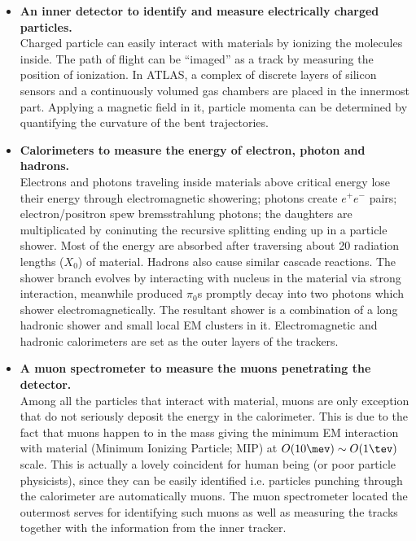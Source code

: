 \begin{itemize}
\item \textbf{An inner detector to identify and measure electrically charged particles.} \\
Charged particle can easily interact with materials by ionizing the molecules inside. 
The path of flight can be ``imaged'' as a track by measuring the position of ionization. 
In ATLAS, a complex of discrete layers of silicon sensors and a continuously volumed gas chambers are placed in the innermost part. 
Applying a magnetic field in it, particle momenta can be determined by quantifying the curvature of the bent trajectories. 

\item \textbf{Calorimeters to measure the energy of electron, photon and hadrons.} \\
Electrons and photons traveling inside materials above critical energy lose their energy through electromagnetic showering; photons create $e^+e^-$ pairs; electron/positron spew bremsstrahlung photons; the daughters are multiplicated by coninuting the recursive splitting ending up in a particle shower. 
Most of the energy are absorbed after traversing about 20 radiation lengths ($X_0$) of material. 
%
Hadrons also cause similar cascade reactions. 
The shower branch evolves by interacting with nucleus in the material via strong interaction, meanwhile produced $\pi_0$s promptly decay into two photons which shower electromagnetically. 
The resultant shower is a combination of a long hadronic shower and small local EM clusters in it. 
Electromagnetic and hadronic calorimeters are set as the outer layers of the trackers.\\

\item \textbf{A muon spectrometer to measure the muons penetrating the detector.} \\
Among all the particles that interact with material, muons are only exception that do not seriously deposit the energy in the calorimeter. 
This is due to the fact that muons happen to in the mass giving the minimum EM interaction with material (Minimum Ionizing Particle; MIP) at $O(10\mev) \sim O(1\tev)$ scale.
This is actually a lovely coincident for human being (or poor particle physicists), 
since they can be easily identified i.e. particles punching through the calorimeter are automatically muons. 
The muon spectrometer located the outermost serves for identifying such muons as well as measuring the tracks together with the information from the inner tracker.
\end{itemize}

